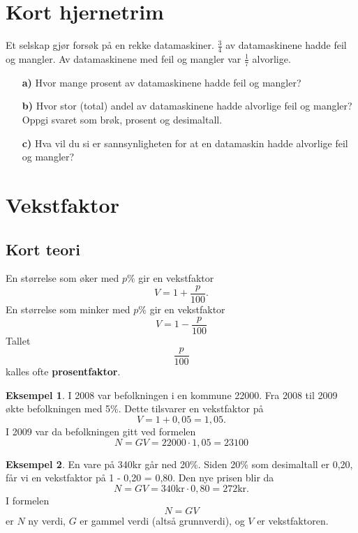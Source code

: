 \documentclass[a4, 11pt, twoside]{article}
\theoremstyle{definition}
\newtheorem{eksempel}{Eksempel}
\begin{document}
\section{Kort hjernetrim}
\begin{Exercise}
  Et selskap gjør forsøk på en rekke datamaskiner. $\frac{3}{4}$ av datamaskinene
  hadde feil og mangler. Av datamaskinene med feil og mangler var $\frac{1}{7}$ alvorlige.
\begin{itemize}
\item[\bf a)] Hvor mange prosent av datamaskinene hadde feil og mangler?
\item[\bf b)] Hvor stor (total) andel av datamaskinene hadde alvorlige feil og mangler? Oppgi svaret som
  brøk, prosent og desimaltall.
\item[\bf c)] Hva vil du si er sannsynligheten for at en datamaskin hadde alvorlige feil og mangler?
\end{itemize}
\end{Exercise}


\section{Vekstfaktor}
\subsection*{Kort teori}
En størrelse som øker med $p\%$ gir en vekstfaktor
\[V = 1 + \frac{p}{100}. \]
En størrelse som minker med $p\%$ gir en vekstfaktor
\[V = 1 - \frac{p}{100} \]
Tallet \[\frac{p}{100} \] kalles ofte \textbf{prosentfaktor}.
\begin{eksempel}
I 2008 var befolkningen i en kommune 22000. Fra 2008 til 2009 økte befolkningen
med 5\%. Dette tilsvarer en vekstfaktor på 
\[V = 1 + 0,05 = 1,05.\] I 2009 var da befolkningen gitt ved formelen
\[ N = GV = 22000\cdot1,05 = 23100 \]
\end{eksempel}

\begin{eksempel}
  En vare på 340kr går ned 20\%. Siden 20\% som desimaltall er 0,20, 
  får vi en vekstfaktor på
  1 - 0,20 = 0,80.
  Den nye prisen blir da \[N = GV = 340\text{kr}\cdot0,80 = 272\text{kr}. \]
  I formelen \[N = GV \] er $N$ ny verdi, $G$ er gammel verdi (altså grunnverdi),
  og $V$ er vekstfaktoren.
\end{eksempel}
\end{document}
